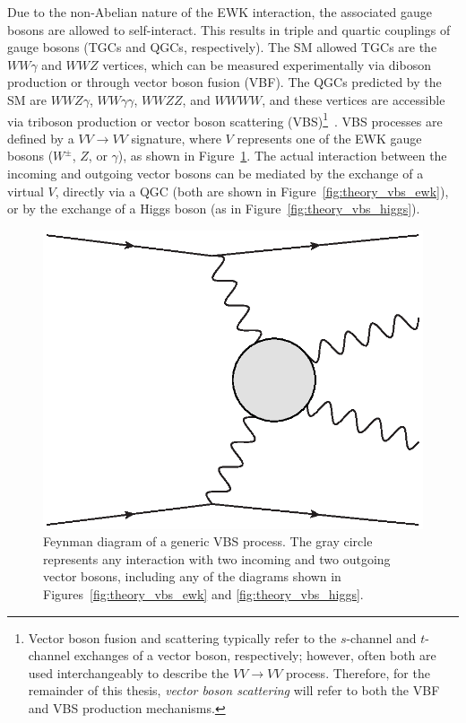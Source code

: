 Due to the non-Abelian nature of the EWK interaction, the associated gauge bosons are allowed to self-interact.
This results in triple and quartic couplings of gauge bosons (TGCs and QGCs, respectively).
The SM allowed TGCs are the $WW\gamma$ and $WWZ$ vertices, which can be measured experimentally via diboson production or through vector boson fusion (VBF).
The QGCs predicted by the SM are $WWZ\gamma$, $WW\gamma\gamma$, $WWZZ$, and $WWWW$, and these vertices are accessible via triboson production or vector boson scattering (VBS)\footnote{Vector boson fusion and scattering typically refer to the $s$-channel and $t$-channel exchanges of a vector boson, respectively; however, often both are used interchangeably to describe the $VV\rightarrow VV$ process.  Therefore, for the remainder of this thesis, \emph{vector boson scattering} will refer to both the VBF and VBS production mechanisms.}~\cite{2017.multiboson-at-lhc}.
VBS processes are defined by a $VV\rightarrow VV$ signature, where $V$ represents one of the EWK gauge bosons ($W^{\pm}$, $Z$, or $\gamma$), as shown in Figure~\ref{fig:theory_generic_vbs}.
The actual interaction between the incoming and outgoing vector bosons can be mediated by the exchange of a virtual $V$, directly via a QGC (both are shown in Figure~\ref{fig:theory_vbs_ewk}), or by the exchange of a Higgs boson (as in Figure~\ref{fig:theory_vbs_higgs}).

\begin{figure}[htbp]
  \centering
  \includegraphics[width=.4\textwidth]{figs/theory/generic_vbs}
  \caption{Feynman diagram of a generic VBS process.  The gray circle represents any interaction with two incoming and two outgoing vector bosons, including any of the diagrams shown in Figures~\ref{fig:theory_vbs_ewk} and \ref{fig:theory_vbs_higgs}.}
  \label{fig:theory_generic_vbs}
\end{figure}

